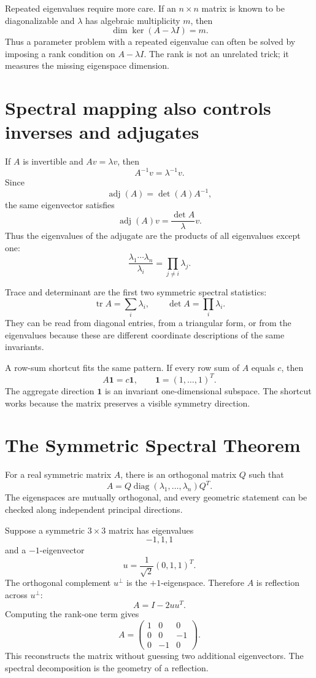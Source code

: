 Repeated eigenvalues require more care.  If an \(n\times n\) matrix is known to be diagonalizable and \(\lambda\) has algebraic multiplicity \(m\), then
\[
  \dim\ker(A-\lambda I)=m.
\]
Thus a parameter problem with a repeated eigenvalue can often be solved by imposing a rank condition on \(A-\lambda I\).  The rank is not an unrelated trick; it measures the missing eigenspace dimension.

\section{Spectral mapping also controls inverses and adjugates}

If \(A\) is invertible and \(Av=\lambda v\), then
\[
  A^{-1}v=\lambda^{-1}v.
\]
Since
\[
  \operatorname{adj}(A)=\det(A)A^{-1},
\]
the same eigenvector satisfies
\[
  \operatorname{adj}(A)v
  =\frac{\det A}{\lambda}v.
\]
Thus the eigenvalues of the adjugate are the products of all eigenvalues except one:
\[
  \frac{\lambda_1\cdots\lambda_n}{\lambda_i}
  =\prod_{j\ne i}\lambda_j.
\]

Trace and determinant are the first two symmetric spectral statistics:
\[
  \operatorname{tr}A=\sum_i\lambda_i,
  \qquad
  \det A=\prod_i\lambda_i.
\]
They can be read from diagonal entries, from a triangular form, or from the eigenvalues because these are different coordinate descriptions of the same invariants.

A row-sum shortcut fits the same pattern.  If every row sum of \(A\) equals \(c\), then
\[
  A\mathbf1=c\mathbf1,
  \qquad
  \mathbf1=(1,\ldots,1)^T.
\]
The aggregate direction \(\mathbf1\) is an invariant one-dimensional subspace.  The shortcut works because the matrix preserves a visible symmetry direction.

\section{The Symmetric Spectral Theorem}

For a real symmetric matrix \(A\), there is an orthogonal matrix \(Q\) such that
\[
  A=Q\operatorname{diag}(\lambda_1,\ldots,\lambda_n)Q^T.
\]
The eigenspaces are mutually orthogonal, and every geometric statement can be checked along independent principal directions.

Suppose a symmetric \(3\times3\) matrix has eigenvalues
\[
  -1,1,1
\]
and a \(-1\)-eigenvector
\[
  u=\frac1{\sqrt2}(0,1,1)^T.
\]
The orthogonal complement \(u^\perp\) is the \(+1\)-eigenspace.  Therefore \(A\) is reflection across \(u^\perp\):
\[
  A=I-2uu^T.
\]
Computing the rank-one term gives
\[
  A=
  \begin{pmatrix}
    1&0&0\\
    0&0&-1\\
    0&-1&0
  \end{pmatrix}.
\]
This reconstructs the matrix without guessing two additional eigenvectors.  The spectral decomposition is the geometry of a reflection.

